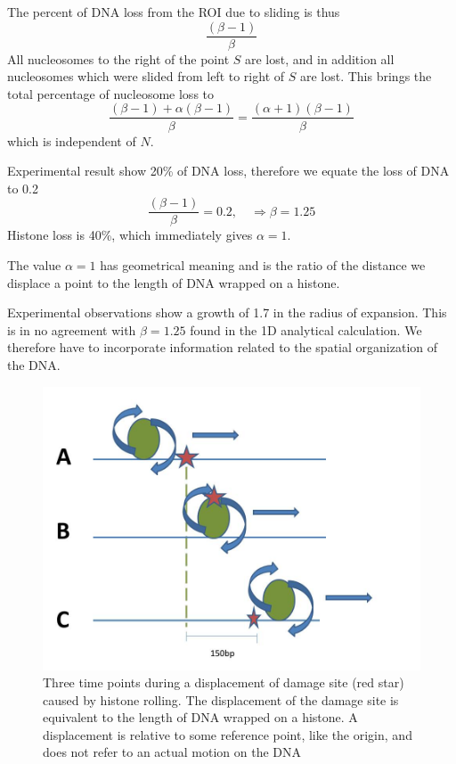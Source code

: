 \documentclass[12pt]{report}
\begin{document}
   The percent of DNA loss from the ROI due to sliding is thus 
   \begin{equation}
   \frac{(\beta-1)}{\beta}
   \end{equation}
   All nucleosomes to the right of the point $S$ are lost, and in addition all nucleosomes which were slided from left to right of $S$ are lost. This brings the total percentage of nucleosome loss to 
   \begin{equation*}
   \frac{(\beta-1) +\alpha(\beta -1)}{\beta}= \frac{(\alpha+1)(\beta -1)}{\beta}
   \end{equation*}
   which is independent of $N$.
   
   Experimental result show 20\% of DNA loss, therefore we equate the loss of DNA to 0.2 
   \begin{equation*}
   \frac{(\beta -1)}{\beta}=0.2, \quad \Rightarrow \beta = 1.25
   \end{equation*}     
   Histone loss is 40\%, which immediately gives $\alpha =1$.
   
   The value $\alpha=1$ has geometrical meaning and is the ratio of the distance we displace a point to the length of DNA wrapped on a histone. 
   
   Experimental observations show a growth of 1.7 in the radius of expansion. This is in no agreement with $\beta=1.25$ found in the 1D analytical calculation. We therefore have to incorporate information related to the spatial organization of the DNA. 
   
   
   \begin{figure}
   	\centering
   	\includegraphics[width=0.7\linewidth]{histoneSlidingSingle}
   	\caption{{Three time points during a displacement of damage site (red star) caused by histone rolling. The displacement of the damage site is equivalent to the length of DNA wrapped on a histone. A displacement is relative to some reference point, like the origin, and does not refer to an actual motion on the DNA}}
   	\label{fig:histoneSlidingSingle}
   \end{figure}
   
\end{document}
